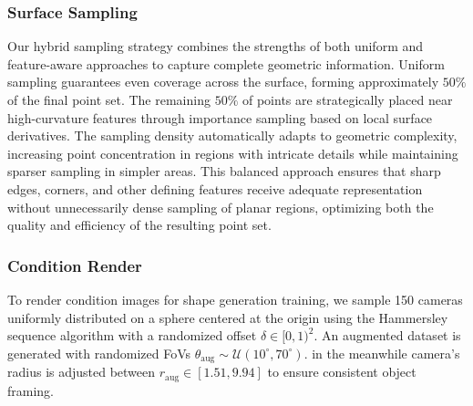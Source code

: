\subsubsection{Surface Sampling} Our hybrid sampling strategy combines the strengths of both uniform and feature-aware approaches to capture complete geometric information. Uniform sampling guarantees even coverage across the surface, forming approximately $50\%$ of the final point set. The remaining $50\%$ of points are strategically placed near high-curvature features through importance sampling based on local surface derivatives. The sampling density automatically adapts to geometric complexity, increasing point concentration in regions with intricate details while maintaining sparser sampling in simpler areas. This balanced approach ensures that sharp edges, corners, and other defining features receive adequate representation without unnecessarily dense sampling of planar regions, optimizing both the quality and efficiency of the resulting point set.

\subsubsection{Condition Render}
To render condition images for shape generation training, we sample 150 cameras uniformly distributed on a sphere centered at the origin using the Hammersley sequence algorithm with a randomized offset $\delta \in [0,1)^2$. An augmented dataset is generated with randomized FoVs $\theta_{\text{aug}} \sim \mathcal{U}(10^\circ, 70^\circ)$. in the meanwhile camera's  radius is adjusted between $r_{\text{aug}} \in [1.51, 9.94]$ to ensure consistent object framing.  %

